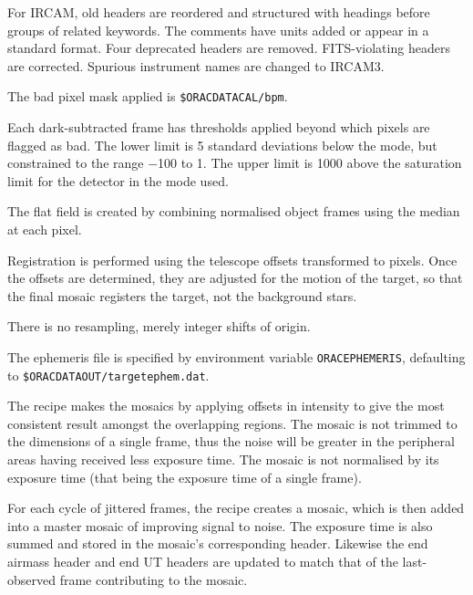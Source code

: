 \documentclass[twoside,11pt]{article}
\renewcommand{\_}{\texttt{\symbol{95}}}
\newcommand{\sstitem}{\item}
\begin{document}
{{{         \sstitem
         For IRCAM, old headers are reordered and structured with
         headings before groups of related keywords.  The comments have
         units added or appear in a standard format.  Four deprecated
         headers are removed.  FITS-violating headers are corrected.
         Spurious instrument names are changed to IRCAM3.

         \sstitem
         The bad pixel mask applied is {\tt\$ORAC\_DATA\_CAL/bpm}.

         \sstitem
         Each dark-subtracted frame has thresholds applied beyond which
         pixels are flagged as bad.  The lower limit is 5 standard
         deviations below the mode, but constrained to the range $-$100 to 1.
         The upper limit is 1000 above the saturation limit for the detector
         in the mode used.

         \sstitem
         The flat field is created by combining normalised object
         frames using the median at each pixel.

         \sstitem
         Registration is performed using the telescope offsets
         transformed to pixels.  Once the offsets are determined, they
         are adjusted for the motion of the target, so that the final
         mosaic registers the target, not the background stars.

         \sstitem
         There is no resampling, merely integer shifts of origin.

         \sstitem
         The ephemeris file is specified by environment variable
         {\tt{ORAC\_EPHEMERIS}}, defaulting to {\tt \$ORAC\_DATA\_OUT/target\_ephem.dat}.

         \sstitem
         The recipe makes the mosaics by applying offsets in intensity
         to give the most consistent result amongst the overlapping regions.
         The mosaic is not trimmed to the dimensions of a single frame, thus
         the noise will be greater in the peripheral areas having received
         less exposure time.  The mosaic is not normalised by its exposure
         time (that being the exposure time of a single frame).

         \sstitem
         For each cycle of jittered frames, the recipe creates a mosaic,
         which is then added into a master mosaic of improving signal to
         noise.  The exposure time is also summed and stored in the
	 mosaic's corresponding header.  Likewise the end airmass
	 header and end UT headers are updated to match that of the
	 last-observed frame contributing to the mosaic.

}}}
\end{document}
